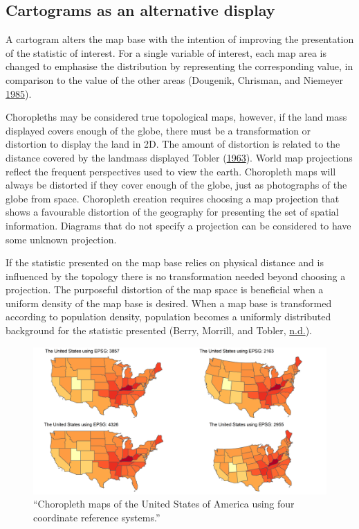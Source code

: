 \documentclass[11pt,]{article}
\begin{document}
\hypertarget{cartograms-as-an-alternative-display}{%
\subsection{Cartograms as an alternative
display}\label{cartograms-as-an-alternative-display}}

A cartogram alters the map base with the intention of improving the
presentation of the statistic of interest. For a single variable of
interest, each map area is changed to emphasise the distribution by
representing the corresponding value, in comparison to the value of the
other areas (Dougenik, Chrisman, and Niemeyer
\protect\hyperlink{ref-ACCAC}{1985}).

Choropleths may be considered true topological maps, however, if the
land mass displayed covers enough of the globe, there must be a
transformation or distortion to display the land in 2D. The amount of
distortion is related to the distance covered by the landmass displayed
Tobler (\protect\hyperlink{ref-GAMP}{1963}). World map projections
reflect the frequent perspectives used to view the earth. Choropleth
maps will always be distorted if they cover enough of the globe, just as
photographs of the globe from space. Choropleth creation requires
choosing a map projection that shows a favourable distortion of the
geography for presenting the set of spatial information. Diagrams that
do not specify a projection can be considered to have some unknown
projection.

If the statistic presented on the map base relies on physical distance
and is influenced by the topology there is no transformation needed
beyond choosing a projection. The purposeful distortion of the map space
is beneficial when a uniform density of the map base is desired. When a
map base is transformed according to population density, population
becomes a uniformly distributed background for the statistic presented
(Berry, Morrill, and Tobler, \protect\hyperlink{ref-GOINO}{n.d.}).

\begin{figure}
\centering
\includegraphics{figures/ggchoroCRS.png}
\caption{``Choropleth maps of the United States of America using four
coordinate reference systems.''}
\end{figure}
\end{document}
